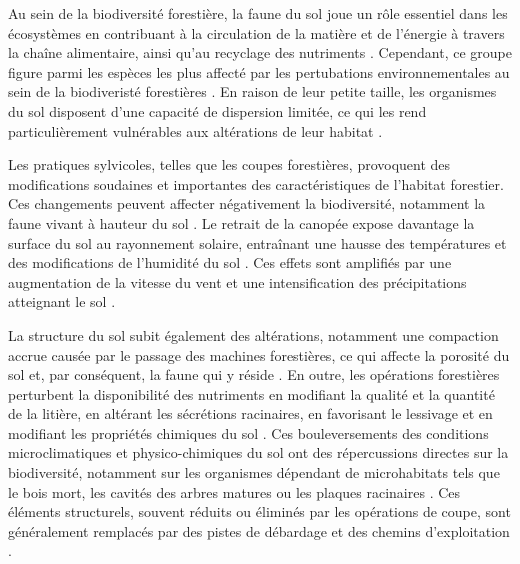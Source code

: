 Au sein de la biodiversité forestière, la faune du sol joue un rôle essentiel dans les écosystèmes en contribuant à la circulation de la matière et de l'énergie à travers la chaîne alimentaire, ainsi qu'au recyclage des nutriments \citep{Seibold2021contributioninsects,Kudrin2023metaanalysiseffects}.
Cependant, ce groupe figure parmi les espèces les plus affecté par les pertubations environnementales au sein de la biodiveristé forestières \citep{Marshall2000Impactsforest,Coyle2017Soilfauna}. 
En raison de leur petite taille, les organismes du sol disposent d'une capacité de dispersion limitée, ce qui les rend particulièrement vulnérables aux altérations de leur habitat \citep{Kudrin2023metaanalysiseffects}.

Les pratiques sylvicoles, telles que les coupes forestières, provoquent des modifications soudaines et importantes des caractéristiques de l'habitat forestier. 
Ces changements peuvent affecter négativement la biodiversité, notamment la faune vivant à hauteur du sol \citep{Lindo2003Microbialbiomass,Paillet2010Biodiversitydifferences,Fedrowitz2014Canretention,Chaudhary2016Impactforest}. 
Le retrait de la canopée expose davantage la surface du sol au rayonnement solaire, entraînant une hausse des températures et des modifications de l'humidité du sol \citep{Lindo2003Microbialbiomass,Brook2008Synergiesextinction,Zhang2022Intensiveforest}. 
Ces effets sont amplifiés par une augmentation de la vitesse du vent et une intensification des précipitations atteignant le sol \citep{Keenan1993ecologicaleffects,Heithecker2007Edgerelatedgradients}.

La structure du sol subit également des altérations, notamment une compaction accrue causée par le passage des machines forestières, ce qui affecte la porosité du sol et, par conséquent, la faune qui y réside \citep{Battigelli2004Shorttermimpact,Mazerolle2021Woodlandsalamander}. 
En outre, les opérations forestières perturbent la disponibilité des nutriments en modifiant la qualité et la quantité de la litière, en altérant les sécrétions racinaires, en favorisant le lessivage et en modifiant les propriétés chimiques du sol \citep{Covington1981Changesforest,Marshall2000Impactsforest,Lindo2003Microbialbiomass,Battigelli2004Shorttermimpact}. 
Ces bouleversements des conditions microclimatiques et physico-chimiques du sol ont des répercussions directes sur la biodiversité, 
notamment sur les organismes dépendant de microhabitats tels que le bois mort, les cavités des arbres matures ou les plaques racinaires \citep{Berg1994ThreatenedPlant,Spies1999Dynamicforest,Christensen2005Deadwood,Brassard2008EffectsForest}. 
Ces éléments structurels, souvent réduits ou éliminés par les opérations de coupe, sont généralement remplacés par des pistes de débardage et des chemins d'exploitation \citep{Hansen1991ConservingBiodiversity}.

